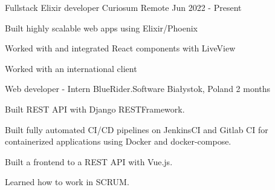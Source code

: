 

\begin{cventries}

  \cventry
    {Fullstack Elixir developer} %
    {Curiosum} %
    {Remote} %
    {Jun 2022 - Present} %
    {
      \begin{cvitems} %
        \item {Built highly scalable web apps using Elixir/Phoenix}
        \item {Worked with and integrated React components with LiveView}
        \item {Worked with an international client}
      \end{cvitems}
    }

  \cventry
    {Web developer - Intern} %
    {BlueRider.Software} %
    {Białystok, Poland} %
    {2 months} %
    {
      \begin{cvitems} %
        \item {Built REST API with Django RESTFramework.}
        \item {Built fully automated CI/CD pipelines on JenkinsCI and Gitlab CI for containerized applications using Docker and docker-compose.}
        \item {Built a frontend to a REST API with Vue.js.}
        \item {Learned how to work in SCRUM.}
      \end{cvitems}
    }

\end{cventries}
